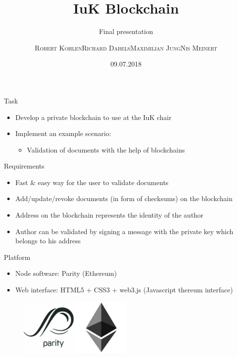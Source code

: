 \documentclass[10pt]{beamer}
\title{IuK Blockchain}
\subtitle{Final presentation}
\author{\textsc{Robert Kohlen}\newline\textsc{Richard Dabels}\newline\textsc{Maximilian Jung}\newline\textsc{Nis Meinert}}
\date{09.07.2018}
\begin{document}
\begin{frame}
	\titlepage
\end{frame}

\begin{frame}{Task}
	\begin{itemize}
		\item Develop a private blockchain to use at the IuK chair
		\item Implement an example scenario:
		\begin{itemize}
			\item Validation of documents with the help of blockchains
		\end{itemize}
	\end{itemize}
\end{frame}

\begin{frame}{Requirements}
	\begin{itemize}
		\item Fast \& easy way for the user to validate documents
		\item Add/update/revoke documents (in form of checksums) on the blockchain
		\item Address on the blockchain represents the identity of the author
		\item Author can be validated by signing a message with the private key which belongs to his address
	\end{itemize}
\end{frame}

\begin{frame}{Platform}
	\begin{itemize}
		\item Node software: Parity (Ethereum)
		\item Web interface: HTML5 + CSS3 + web3.js (Javascript thereum interface)
	\end{itemize}
	\begin{figure}
		\includegraphics[width=0.5\textwidth]{images/parity-ethereum-logo.png}
	\end{figure}
\end{frame}
\end{document}
